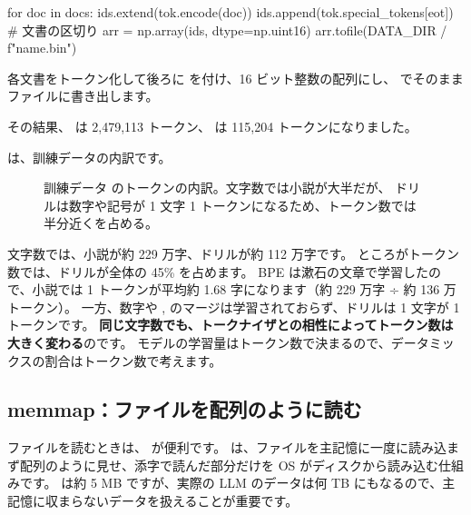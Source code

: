\begin{pycode}
for doc in docs:
    ids.extend(tok.encode(doc))
    ids.append(tok.special_tokens[eot])  # 文書の区切り
arr = np.array(ids, dtype=np.uint16)
arr.tofile(DATA_DIR / f"{name}.bin")
\end{pycode}

各文書をトークン化して後ろに  を付け、16 ビット整数の配列にし、 でそのままファイルに書き出します。

その結果、 は 2,479,113 トークン、 は 115,204 トークンになりました。

は、訓練データの内訳です。

\begin{figure}[tbp]
\centering
{}
\caption{訓練データ  のトークンの内訳。文字数では小説が大半だが、
ドリルは数字や記号が 1 文字 1 トークンになるため、トークン数では半分近くを占める。}
\label{fig:pt-mix}
\end{figure}

文字数では、小説が約 229 万字、ドリルが約 112 万字です。
ところがトークン数では、ドリルが全体の 45\% を占めます。
BPE は漱石の文章で学習したので、小説では 1 トークンが平均約 1.68 字になります（約 229 万字 ÷ 約 136 万トークン）。
一方、数字や \code{+}, \code{=} のマージは学習されておらず、ドリルは 1 文字が 1 トークンです。
\textbf{同じ文字数でも、トークナイザとの相性によってトークン数は大きく変わる}のです。
モデルの学習量はトークン数で決まるので、データミックスの割合はトークン数で考えます。

\subsection{memmap：ファイルを配列のように読む}

ファイルを読むときは、 が便利です。
は、ファイルを主記憶に一度に読み込まず配列のように見せ、添字で読んだ部分だけを OS がディスクから読み込む仕組みです。
 は約 5 MB ですが、実際の LLM のデータは何 TB にもなるので、主記憶に収まらないデータを扱えることが重要です。

